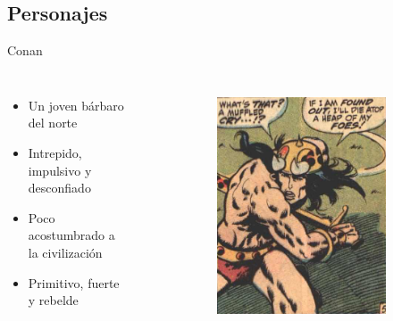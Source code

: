 \subsection{Personajes}
\begin{frame}{Conan}
\begin{columns}
\begin{itemize}
 \item Un joven bárbaro del norte
 \item Intrepido, impulsivo y desconfiado
 \item Poco acostumbrado a la civilización
 \item Primitivo, fuerte y rebelde
\end{itemize}
\begin{figure}[htp]
 \centering
 \begin{subfigure}[b]{0.3\textwidth}
   \includegraphics[width=\textwidth]{img/conan/CTB}
 \end{subfigure}
~
 \begin{subfigure}[b]{0.27\textwidth}

\end{subfigure}
\end{figure}
\end{columns}
\end{frame}
